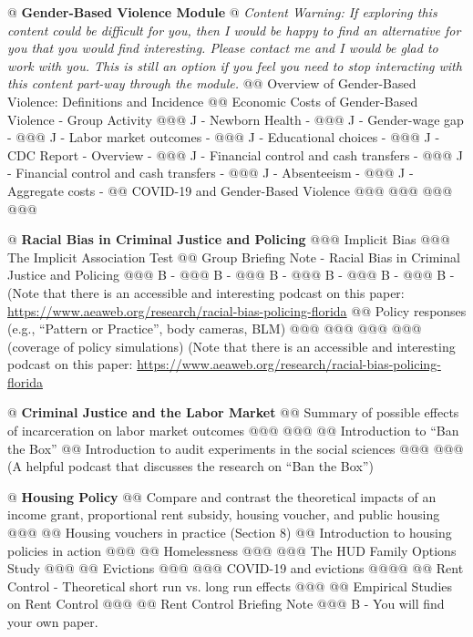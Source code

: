 \documentclass[11pt,letterpaper,final]{article}
\begin{document}
{@ \textbf{Gender-Based Violence Module}
@ \textit{Content Warning: If exploring this content could be difficult for you, then I would be happy to find an alternative for you that you would find interesting. Please contact me and I would be glad to work with you. This is still an option if you feel you need to stop interacting with this content part-way through the module.}
@@ Overview of Gender-Based Violence: Definitions and Incidence
@@ Economic Costs of Gender-Based Violence - Group Activity
@@@ J - Newborn Health - \citet{Aizer2011}
@@@ J - Gender-wage gap - \citet{Aizer2010}
@@@ J - Labor market outcomes - \citet{Sabia2013}
@@@ J - Educational choices - \citet{Borker2018}
@@@ J - CDC Report - Overview - \citet{NCIPC2003}
@@@ J - Financial control and cash transfers - \citet{Bobonis2013}
@@@ J - Financial control and cash transfers - \citet{Hidrobo2013}
@@@ J - Absenteeism - \citet{Reeves2007}
@@@ J - Aggregate costs - \citet{Max2004}
@@ COVID-19 and Gender-Based Violence
@@@ \citet{Ravindran2020}
@@@ \citet{Bullinger2020}
@@@ \citet{Leslie2020}
@@@ \citet{Silverio-Murillo2020}

@ \textbf{Racial Bias in Criminal Justice and Policing}
@@@ Implicit Bias
@@@ The Implicit Association Test
@@ Group Briefing Note - Racial Bias in Criminal Justice and Policing
@@@ B - \citet{Arnold2018}
@@@ B - \citet{Hoekstra2020}
@@@ B - \citet{Antonovics2009}
@@@ B - \citet{Sloan2020}
@@@ B - \citet{Eren2018}
@@@ B - \citet{Goncalves2021} (Note that there is an accessible and interesting podcast on this paper: \url{https://www.aeaweb.org/research/racial-bias-policing-florida}
@@ Policy responses (e.g., ``Pattern or Practice'', body cameras, BLM)
@@@ \citet{Devi2020} 
@@@ \citet{Cubukcu2021}
@@@ \citet{Campbell2021}
@@@ \citet{Goncalves2021} (coverage of policy simulations) (Note that there is an accessible and interesting podcast on this paper: \url{https://www.aeaweb.org/research/racial-bias-policing-florida}

@ \textbf{Criminal Justice and the Labor Market}
@@ Summary of possible effects of incarceration on labor market outcomes
@@@ \citet{Bhuller2020}
@@@ \citet{Eren2021}
@@ Introduction to ``Ban the Box''
@@ Introduction to audit experiments in the social sciences
@@@ \citet{Agan2018}
@@@ \citet{Doleac2019} (A helpful podcast that discusses the research on ``Ban the Box'')

@ \textbf{Housing Policy}
@@ Compare and contrast the theoretical impacts of an income grant, proportional rent subsidy, housing voucher, and public housing
@@@ 
@@ Housing vouchers in practice (Section 8)
@@ Introduction to housing policies in action
@@@ \citet{Metcalf2018}
@@ Homelessness
@@@ \citet{Evans2016}
@@@ The HUD Family Options Study
@@@ \citet{Gubits2017}
@@ Evictions
@@@ \citet{Humphries2019}
@@@ COVID-19 and evictions
@@@@ \citet{Callison2021}
@@ Rent Control - Theoretical short run vs. long run effects
@@@ 
@@ Empirical Studies on Rent Control
@@@ \citet{Jenkins2009}
@@ Rent Control Briefing Note
@@@ B - You will find your own paper.

}
\end{document}
